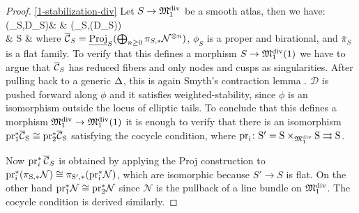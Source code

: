 \begin{proof}\eqref{1-stabilization-div}
Let $S\rightarrow \mathfrak M_1^{\rm{div}}$ be a smooth atlas, then we have:
 \bcd
 (\cC_S,\pazocal D_S)\ar[rr,"\phi_S"]\ar[dr,"\pi_S"] & & (\hC_S,\phi(\pazocal D_S)) \\
 & S &
 \ecd
where $\overline{\mathcal{C}}_S=\underline{\operatorname{Proj}}_{S}(\bigoplus_{n\geq 0}\pi_{S,*}\mathcal N^{\otimes n})$, $\phi_S$ is a proper and birational, and $\bar{\pi}_S$ is a flat family. 
To verify that this defines a morphism $S\rightarrow \mathfrak M_1^{\rm{div}}(1)$ we have to argue that $\overline{\mathcal{C}}_S$ has reduced fibers and only nodes and cusps as singularities. After pulling back to a generic $\Delta$, this is again Smyth's contraction lemma \cite[Lemma~2.13]{SMY1}. $\mathcal D$ is pushed forward along $\phi$ and it satisfies weighted-stability, since $\phi$ is an isomorphism outside the locus of elliptic tails. To conclude that this defines a morphism $\mathfrak M_1^{\rm{div}}\rightarrow \mathfrak M_1^{\rm{div}}(1)$ it is enough to verify that there is an isomorphism
 $\rm{pr}_1^*\overline{\mathcal{C}}_S\cong\rm{pr}_2^*\overline{\mathcal{C}}_S$ satisfying the cocycle condition, where $\rm{pr}_i\colon S'= S\times_{\mathfrak M_1^{\rm{div}}} S\rightrightarrows S$.%

 Now $\operatorname{pr}_i^*\overline{\mathcal{C}}_S$ is obtained by applying the Proj construction to 
 $\rm{pr}_i^*(\pi_{S,*}\mathcal{N})\cong\pi_ {S',*} (\rm{pr}_i^*\mathcal N)$, which are isomorphic because $S'\to S$ is flat. On the other hand $\rm{pr}_1^*\mathcal N\cong \rm{pr}_2^*\mathcal N$ since $\mathcal N$ is the pullback of a line bundle on $\mathfrak M_1^{\rm{div}}$. The cocycle condition is derived similarly. 
\end{proof}


